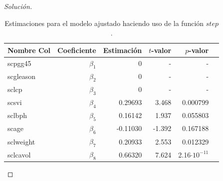 \documentclass[10.5pt,notitlepage]{article}
\newenvironment{solucion}
  {\begin{proof}[Solución]}
  {\end{proof}}
\theoremstyle{plain}
\begin{document}
\begin{solucion}
\begin{table}[H]
        \centering
        \begin{tabular}{@{}l@{\hskip 0.3in}r@{\hskip 0.3in}r@{\hskip 0.3in}r@{\hskip 0.3in}r@{\hskip 0.3in}r@{}}
            \toprule
        Nombre Col&Coeficiente& Estimación & \(t\)-valor& \(p\)-valor \\
            \midrule
scpgg45    &\(\beta_1\)& 0 & -&-\\
scgleason  &\(\beta_2\)& 0 & -&-\\
sclcp      &\(\beta_3\)&0  &-&-    \\             
scsvi  & \(\beta_{4}\)  & 0.29693   &3.468 &0.000799 \\
sclbph &\(\beta_{5}\)  & 0.16142   &1.937 &0.055803   \\
scage  &\(\beta_{6}\) &-0.11030   &-1.392 &0.167188    \\
sclweight&\(\beta_{7}\)& 0.20933   &2.553 &0.012329   \\
sclcavol&\(\beta_{8}\)& 0.66320   &7.624 &2.16\(\cdot 10^{-11}\)\\
            \bottomrule
        \end{tabular}
        \caption{Estimaciones para el modelo ajustado haciendo uso de la función \(step\).}
        \label{tab:5}
\end{table}


\end{solucion}
\end{document}
